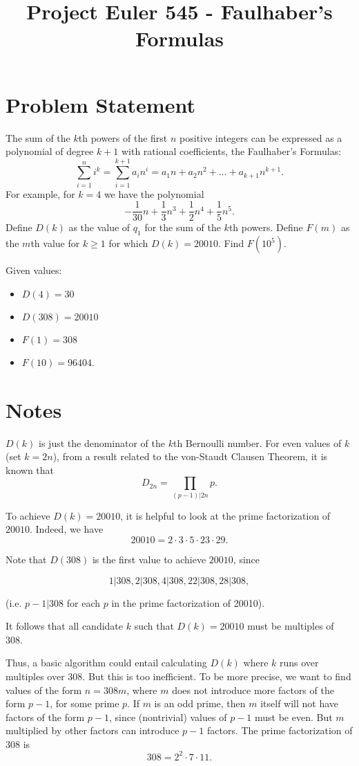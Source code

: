 \documentclass{article}
\title{Project Euler 545 - Faulhaber's Formulas}
\begin{document}
\maketitle
\section{Problem Statement}
The sum of the $k$th powers of the first $n$ positive integers can be expressed as a polynomial of degree $k+1$ with rational coefficients, the Faulhaber's Formulas:
\[
\sum_{i=1}^{n} i^k = \sum_{i=1}^{k+1} a_i n^i = a_1 n + a_2 n^2 + \dots + a_{k+1} n^{k+1}.
\]
For example, for $k = 4$ we have the polynomial
\[
- \frac{1}{30} n + \frac{1}{3} n^3 + \frac{1}{2} n^4 + \frac{1}{5} n^5.
\]
Define $D(k)$ as the value of $q_1$ for the sum of the $k$th powers.  Define $F(m)$ as the $m$th value for $k \geq 1$ for which $D(k) = 20010$. Find $F(10^5)$.

Given values:
\begin{itemize}
\item $D(4) = 30$
\item $D(308) = 20010$
\item $F(1) = 308$
\item $F(10) = 96404$.
\end{itemize}

\section{Notes}
$D(k)$ is just the denominator of the $k$th Bernoulli number.  For even values of $k$ (set $k = 2n$), from a result related to the von-Staudt Clausen Theorem, it is known that
\[
 D_{2n} = \prod_{(p-1) | 2n} p.
\]

To achieve $D(k) = 20010$, it is helpful to look at the prime factorization of $20010$.  Indeed, we have
\[
20010 = 2 \cdot 3 \cdot 5 \cdot 23 \cdot 29.
\] 

Note that $D(308)$ is the first value to achieve $20010$, since 

\[
1 | 308, 2 | 308, 4 | 308, 22 | 308, 28 | 308, 
\]

(i.e. $p-1 | 308$ for each $p$ in the prime factorization of 20010).

It follows that all candidate $k$ such that $D(k) = 20010$ must be multiples of 308.

Thus, a basic algorithm could entail calculating $D(k)$ where $k$ runs over multiples over 308.  But this is too inefficient.  To be more precise, we want to find values of the form $n = 308m$, where $m$ does not introduce more factors of the form $p-1$, for some prime $p$.  If $m$ is an odd prime, then $m$ itself will not have factors of the form $p-1$, since (nontrivial) values of $p-1$ must be even.  But $m$ multiplied by other factors can introduce $p-1$ factors.  The prime factorization of $308$ is 
\[
308 = 2^2 \cdot 7 \cdot 11.
\]
\end{document}
